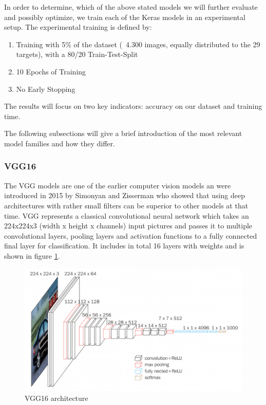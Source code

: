 In order to determine, which of the above stated models we will further evaluate and possibly optimize, we train each of the Keras models in an experimental setup. The experimental training is defined by:
\begin{enumerate}
    \item Training with 5\% of the dataset (~4.300 images, equally distributed to the 29 targets), with a 80/20 Train-Test-Split
    \item 10 Epochs of Training
    \item No Early Stopping
\end{enumerate}

The results will focus on two key indicators: accuracy on our dataset and training time.

The following subsections will give a brief introduction of the most relevant model families and how they differ.

\subsubsection{VGG16}
The VGG models are one of the earlier computer vision models an were introduced in 2015 by Simonyan and Zisserman who showed that using deep architectures with rather small filters can be superior to other models at that time\cite{simonyan2015deep}. VGG represents a classical convolutional neural network which takes an 224x224x3 (width x height x channels) input pictures and passes it to multiple convolutional layers, pooling layers and activation functions to a fully connected final layer for classification. It includes in total 16 layers with weights and is shown in figure \ref{fig:vgg16}.

\begin{figure}
  \centering
  \includegraphics[width=\linewidth]{figures/vgg16.png}
  \caption{VGG16 architecture}
  \label{fig:vgg16}
\end{figure}

